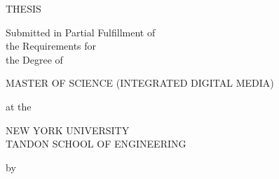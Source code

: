 %
\setcounter{page}{1}
\thispagestyle{empty}
%
\begin{center}
{\bfseries 
  {\large\thesistitle}
  \vspace{.25in}
  
  THESIS\\
  \vspace{.25in}
  
  Submitted in Partial Fulfillment of\\
  \vspace{0.05in}
  the Requirements for\\
  \vspace{0.05in}
  the Degree of\\
  \vspace{.25in}
  
  MASTER OF SCIENCE (INTEGRATED DIGITAL MEDIA)\\
  \vspace{.25in}
  
  at the \\
  \vspace{.1in}
  
  {\large
  NEW YORK UNIVERSITY\\
  \vspace{0.05in}
  TANDON SCHOOL OF ENGINEERING\\
  }
  \vspace{.25in}
  
  by
  \vspace{.25in}

  \thesisauthor
  \vspace{.1in}

  \graddate
}

\end{center}

\vspace{0.1in}

\noindent
{}
\vspace{0.1in}

\noindent
\makebox[\textwidth]{\hfill\makebox[2.5in]{\hrulefill}}\\
\vspace{0.05in}

\noindent
\makebox[\textwidth]{\hfill\makebox[2.5in]{\hrulefill}}\\
\vspace{0.05in}

